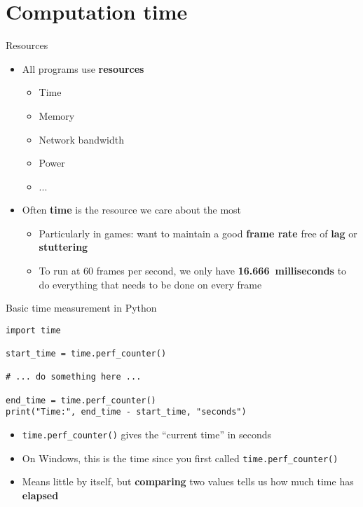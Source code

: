 \part{Computation time}
\frame{\partpage}

\begin{frame}{Resources}
	\begin{itemize}
		\pause\item All programs use \textbf{resources}
			\begin{itemize}
				\pause\item Time
				\pause\item Memory
				\pause\item Network bandwidth
				\pause\item Power
				\pause\item ...
			\end{itemize}
		\pause\item Often \textbf{time} is the resource we care about the most
			\begin{itemize}
				\pause\item Particularly in games:
					want to maintain a good \textbf{frame rate}
					free of \textbf{lag} or \textbf{stuttering}
				\pause\item To run at 60 frames per second, we only have \textbf{16.666~milliseconds} to do everything that needs to be done on every frame
			\end{itemize}
	\end{itemize}
\end{frame}

\begin{frame}[fragile]{Basic time measurement in Python}
	\begin{lstlisting}
import time

start_time = time.perf_counter()

# ... do something here ...

end_time = time.perf_counter()
print("Time:", end_time - start_time, "seconds")
	\end{lstlisting}
	
	\begin{itemize}
		\pause\item \lstinline{time.perf_counter()} gives the ``current time'' in seconds
		\pause\item On Windows, this is the time since you first called \lstinline{time.perf_counter()}
		\pause\item Means little by itself, but \textbf{comparing} two values tells us how much time has \textbf{elapsed}
	\end{itemize}
\end{frame}

